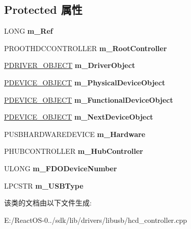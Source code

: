 \subsection*{Protected 属性}
\begin{DoxyCompactItemize}
\item 
\mbox{\label{class_c_h_c_d_controller_abc5dec3e15b68b6205294fc4599eb5d6}} 
L\+O\+NG {\bfseries m\+\_\+\+Ref}
\item 
\mbox{\label{class_c_h_c_d_controller_ae45226f1ae3203fdb14f6941d5cc07be}} 
P\+R\+O\+O\+T\+H\+D\+C\+C\+O\+N\+T\+R\+O\+L\+L\+ER {\bfseries m\+\_\+\+Root\+Controller}
\item 
\mbox{\label{class_c_h_c_d_controller_aa79e667729dd48cfc57842857fe71c37}} 
\hyperlink{struct___d_r_i_v_e_r___o_b_j_e_c_t}{P\+D\+R\+I\+V\+E\+R\+\_\+\+O\+B\+J\+E\+CT} {\bfseries m\+\_\+\+Driver\+Object}
\item 
\mbox{\label{class_c_h_c_d_controller_ae174197759dc8e0ec4c5cc6ce60177db}} 
\hyperlink{struct___d_e_v_i_c_e___o_b_j_e_c_t}{P\+D\+E\+V\+I\+C\+E\+\_\+\+O\+B\+J\+E\+CT} {\bfseries m\+\_\+\+Physical\+Device\+Object}
\item 
\mbox{\label{class_c_h_c_d_controller_a9b2e46f32de2d24c949e557463d90349}} 
\hyperlink{struct___d_e_v_i_c_e___o_b_j_e_c_t}{P\+D\+E\+V\+I\+C\+E\+\_\+\+O\+B\+J\+E\+CT} {\bfseries m\+\_\+\+Functional\+Device\+Object}
\item 
\mbox{\label{class_c_h_c_d_controller_a4e123edd8c6469e472253b638b4d9c41}} 
\hyperlink{struct___d_e_v_i_c_e___o_b_j_e_c_t}{P\+D\+E\+V\+I\+C\+E\+\_\+\+O\+B\+J\+E\+CT} {\bfseries m\+\_\+\+Next\+Device\+Object}
\item 
\mbox{\label{class_c_h_c_d_controller_a1266159e167478b625c3aaded264a415}} 
P\+U\+S\+B\+H\+A\+R\+D\+W\+A\+R\+E\+D\+E\+V\+I\+CE {\bfseries m\+\_\+\+Hardware}
\item 
\mbox{\label{class_c_h_c_d_controller_a2dcc71594d7e7ae96e04bfd2e155dbad}} 
P\+H\+U\+B\+C\+O\+N\+T\+R\+O\+L\+L\+ER {\bfseries m\+\_\+\+Hub\+Controller}
\item 
\mbox{\label{class_c_h_c_d_controller_afb2bdee5c81a22f5a41a63c674cdb1bb}} 
U\+L\+O\+NG {\bfseries m\+\_\+\+F\+D\+O\+Device\+Number}
\item 
\mbox{\label{class_c_h_c_d_controller_a1e2f6e6c94062b430d089438f3f2495f}} 
L\+P\+C\+S\+TR {\bfseries m\+\_\+\+U\+S\+B\+Type}
\end{DoxyCompactItemize}


该类的文档由以下文件生成\+:\begin{DoxyCompactItemize}
\item 
E\+:/\+React\+O\+S-\/0../sdk/lib/drivers/libusb/hcd\+\_\+controller.\+cpp\end{DoxyCompactItemize}

